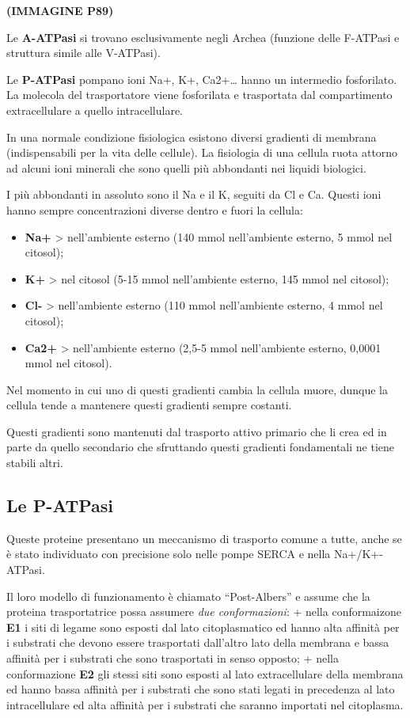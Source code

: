 \documentclass[]{article}
\begin{document}
\textbf{(IMMAGINE P89)}

Le \textbf{A-ATPasi} si trovano esclusivamente negli Archea (funzione
delle F-ATPasi e struttura simile alle V-ATPasi).

Le \textbf{P-ATPasi} pompano ioni Na+, K+, Ca2+\ldots{} hanno un
intermedio fosforilato. La molecola del trasportatore viene fosforilata
e trasportata dal compartimento extracellulare a quello intracellulare.

In una normale condizione fisiologica esistono diversi gradienti di
membrana (indispensabili per la vita delle cellule). La fisiologia di
una cellula ruota attorno ad alcuni ioni minerali che sono quelli più
abbondanti nei liquidi biologici.

I più abbondanti in assoluto sono il Na e il K, seguiti da Cl e Ca.
Questi ioni hanno sempre concentrazioni diverse dentro e fuori la
cellula:

\begin{itemize}
\itemsep1pt\parskip0pt
\item
  \textbf{Na+} \textgreater{} nell'ambiente esterno (140 mmol
  nell'ambiente esterno, 5 mmol nel citosol);
\item
  \textbf{K+} \textgreater{} nel citosol (5-15 mmol nell'ambiente
  esterno, 145 mmol nel citosol);
\item
  \textbf{Cl-} \textgreater{} nell'ambiente esterno (110 mmol
  nell'ambiente esterno, 4 mmol nel citosol);
\item
  \textbf{Ca2+} \textgreater{} nell'ambiente esterno (2,5-5 mmol
  nell'ambiente esterno, 0,0001 mmol nel citosol).
\end{itemize}

Nel momento in cui uno di questi gradienti cambia la cellula muore,
dunque la cellula tende a mantenere questi gradienti sempre costanti.

Questi gradienti sono mantenuti dal trasporto attivo primario che li
crea ed in parte da quello secondario che sfruttando questi gradienti
fondamentali ne tiene stabili altri.

\subsection{Le P-ATPasi}\label{le-p-atpasi}

Queste proteine presentano un meccanismo di trasporto comune a tutte,
anche se è stato individuato con precisione solo nelle pompe SERCA e
nella Na+/K+-ATPasi.

Il loro modello di funzionamento è chiamato ``Post-Albers'' e assume che
la proteina trasportatrice possa assumere \emph{due conformazioni}: +
nella conformaizone \textbf{E1} i siti di legame sono esposti dal lato
citoplasmatico ed hanno alta affinità per i substrati che devono essere
trasportati dall'altro lato della membrana e bassa affinità per i
substrati che sono trasportati in senso opposto; + nella conformazione
\textbf{E2} gli stessi siti sono esposti al lato extracellulare della
membrana ed hanno bassa affinità per i substrati che sono stati legati
in precedenza al lato intracellulare ed alta affinità per i substrati
che saranno importati nel citoplasma.
\end{document}
